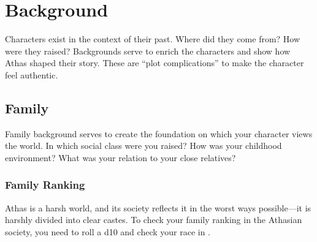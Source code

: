 \section{Background}
Characters exist in the context of their past. Where did they come from? How were they raised? Backgrounds serve to enrich the characters and show how Athas shaped their story. These are ``plot complications'' to make the character feel authentic.

\subsection{Family}
Family background serves to create the foundation on which your character views the world. In which social class were you raised? How was your childhood environment? What was your relation to your close relatives?

\subsubsection{Family Ranking}
Athas is a harsh world, and its society reflects it in the worst ways possible---it is harshly divided into clear castes. To check your family ranking in the Athasian society, you need to roll a d10 and check your race in .

